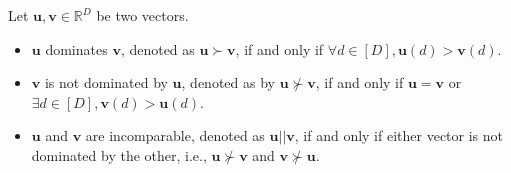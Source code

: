 \begin{definition}
Let $\boldsymbol{u}, \boldsymbol{v} \in \mathbb{R}^{D}$ be two vectors.
\begin{itemize}[leftmargin=*]
    \item $\boldsymbol{u}$ dominates $\boldsymbol{v}$, denoted as $\boldsymbol{u} \succ \boldsymbol{v}$, if and only if $\forall d \in [D], \boldsymbol{u}(d) > \boldsymbol{v}(d)$.
    \item $\boldsymbol{v}$ is not dominated by $\boldsymbol{u}$, denoted as by $\boldsymbol{u} \not\succ \boldsymbol{v}$, if and only if $\boldsymbol{u} = \boldsymbol{v}$ or $\exists d \in [D], \boldsymbol{v}(d) > \boldsymbol{u}(d)$.
    \item $\boldsymbol{u}$ and $\boldsymbol{v}$ are incomparable, denoted as $\boldsymbol{u}||\boldsymbol{v}$, if and only if either vector is not dominated by the other, i.e., $\boldsymbol{u} \not\succ \boldsymbol{v}$ and $\boldsymbol{v} \not\succ \boldsymbol{u}$.
\end{itemize}
\end{definition}

